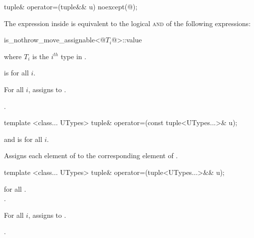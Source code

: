 %
%
\begin{itemdecl}
tuple& operator=(tuple&& u) noexcept(@\seebelow@);
\end{itemdecl}

\begin{itemdescr}
\pnum
\remark The expression inside  is equivalent to the logical \textsc{and} of the
following expressions:

\begin{codeblock}
is_nothrow_move_assignable<@$T_i$@>::value
\end{codeblock}

where $T_i$ is the $i^{th}$ type in .

\pnum
\requires {} is  for all $i$.

\pnum
\effects For all $i$, assigns  to
.

\pnum
\returns {}.
\end{itemdescr}

%
%
\begin{itemdecl}
template <class... UTypes>
  tuple& operator=(const tuple<UTypes...>& u);
\end{itemdecl}

\begin{itemdescr}
\pnum
\requires
{} and
 is  for all $i$.

\pnum
\effects  Assigns each element of  to the corresponding element
of .

\pnum
\returns  {}
\end{itemdescr}

%
%
\begin{itemdecl}
template <class... UTypes>
  tuple& operator=(tuple<UTypes...>&& u);
\end{itemdecl}

\begin{itemdescr}
\pnum
\requires
{} for all .
 \tcode{==}\\.

\pnum
\effects For all $i$, assigns  to
.

\pnum
\returns {}.
\end{itemdescr}

